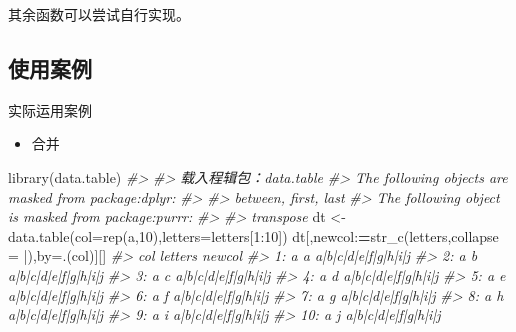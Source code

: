 \documentclass[
]{book}
\newenvironment{Shaded}{\begin{snugshade}}{\end{snugshade}}
\newcommand{\AttributeTok}[1]{\textcolor[rgb]{0.77,0.63,0.00}{#1}}
\newcommand{\CommentTok}[1]{\textcolor[rgb]{0.56,0.35,0.01}{\textit{#1}}}
\newcommand{\DecValTok}[1]{\textcolor[rgb]{0.00,0.00,0.81}{#1}}
\newcommand{\ErrorTok}[1]{\textcolor[rgb]{0.64,0.00,0.00}{\textbf{#1}}}
\newcommand{\FunctionTok}[1]{\textcolor[rgb]{0.00,0.00,0.00}{#1}}
\newcommand{\NormalTok}[1]{#1}
\newcommand{\OtherTok}[1]{\textcolor[rgb]{0.56,0.35,0.01}{#1}}
\newcommand{\SpecialCharTok}[1]{\textcolor[rgb]{0.00,0.00,0.00}{#1}}
\newcommand{\StringTok}[1]{\textcolor[rgb]{0.31,0.60,0.02}{#1}}
\providecommand{\tightlist}{%
  \setlength{\itemsep}{0pt}\setlength{\parskip}{0pt}}
\begin{document}
其余函数可以尝试自行实现。

\hypertarget{ux4f7fux7528ux6848ux4f8b}{%
\subsection{使用案例}\label{ux4f7fux7528ux6848ux4f8b}}

实际运用案例

\begin{itemize}
\tightlist
\item
  合并
\end{itemize}

\begin{Shaded}
\begin{Highlighting}[]
\FunctionTok{library}\NormalTok{(data.table)}
\CommentTok{\#\textgreater{} }
\CommentTok{\#\textgreater{} 载入程辑包：\textquotesingle{}data.table\textquotesingle{}}
\CommentTok{\#\textgreater{} The following objects are masked from \textquotesingle{}package:dplyr\textquotesingle{}:}
\CommentTok{\#\textgreater{} }
\CommentTok{\#\textgreater{}     between, first, last}
\CommentTok{\#\textgreater{} The following object is masked from \textquotesingle{}package:purrr\textquotesingle{}:}
\CommentTok{\#\textgreater{} }
\CommentTok{\#\textgreater{}     transpose}
\NormalTok{dt }\OtherTok{\textless{}{-}} \FunctionTok{data.table}\NormalTok{(}\AttributeTok{col=}\FunctionTok{rep}\NormalTok{(}\StringTok{\textquotesingle{}a\textquotesingle{}}\NormalTok{,}\DecValTok{10}\NormalTok{),}\AttributeTok{letters=}\NormalTok{letters[}\DecValTok{1}\SpecialCharTok{:}\DecValTok{10}\NormalTok{])}
\NormalTok{dt[,newcol}\SpecialCharTok{:}\ErrorTok{=}\FunctionTok{str\_c}\NormalTok{(letters,}\AttributeTok{collapse =} \StringTok{\textquotesingle{}|\textquotesingle{}}\NormalTok{),by}\OtherTok{=}\NormalTok{.(col)][]}
\CommentTok{\#\textgreater{}     col letters              newcol}
\CommentTok{\#\textgreater{}  1:   a       a a|b|c|d|e|f|g|h|i|j}
\CommentTok{\#\textgreater{}  2:   a       b a|b|c|d|e|f|g|h|i|j}
\CommentTok{\#\textgreater{}  3:   a       c a|b|c|d|e|f|g|h|i|j}
\CommentTok{\#\textgreater{}  4:   a       d a|b|c|d|e|f|g|h|i|j}
\CommentTok{\#\textgreater{}  5:   a       e a|b|c|d|e|f|g|h|i|j}
\CommentTok{\#\textgreater{}  6:   a       f a|b|c|d|e|f|g|h|i|j}
\CommentTok{\#\textgreater{}  7:   a       g a|b|c|d|e|f|g|h|i|j}
\CommentTok{\#\textgreater{}  8:   a       h a|b|c|d|e|f|g|h|i|j}
\CommentTok{\#\textgreater{}  9:   a       i a|b|c|d|e|f|g|h|i|j}
\CommentTok{\#\textgreater{} 10:   a       j a|b|c|d|e|f|g|h|i|j}
\end{Highlighting}
\end{Shaded}
\end{document}
